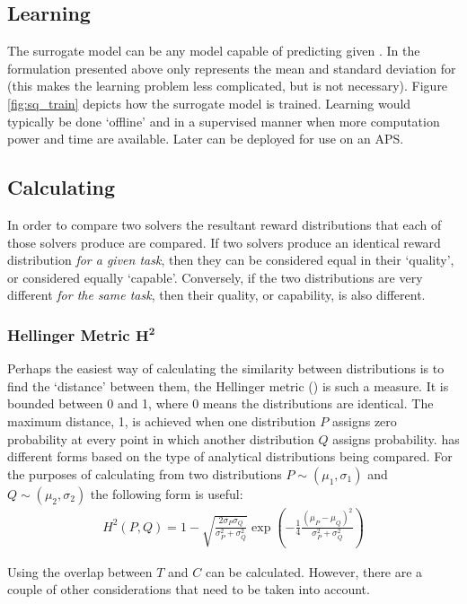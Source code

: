 \subsection{Learning \surrogate}
The surrogate model \surrogate{} can be any model capable of predicting \rwdstarapprox{} given \task. In the formulation presented above \rwdstariapprox{} only represents the mean and standard deviation for \rwdstari{} (this makes the learning problem less complicated, but is not necessary). Figure \ref{fig:sq_train} depicts how the surrogate model is trained. Learning \surrogate{} would typically be done `offline' and in a supervised manner when more computation power and time are available. Later \surrogate{} can be deployed for use on an APS.

\subsection{Calculating \xQ}
In order to compare two solvers the resultant reward distributions that each of those solvers produce are compared. If two solvers produce an identical reward distribution \emph{for a given task}, then they can be considered equal in their `quality', or considered equally `capable'. Conversely, if the two distributions are very different \emph{for the same task}, then their quality, or capability, is also different.

\subsubsection{Hellinger Metric $\bm{H^2}$} \label{sec:hellinger}
Perhaps the easiest way of calculating the similarity between distributions is to find the `distance' between them, the Hellinger metric (\hell) is such a measure. It is bounded between 0 and 1, where 0 means the distributions are identical. The maximum distance, 1, is achieved when one distribution $P$ assigns zero probability at every point in which another distribution $Q$ assigns probability. \hell{} has different forms based on the type of analytical distributions being compared. For the purposes of calculating \xQ{} from two distributions $P \sim (\mu_1,\sigma_1)$ and $Q\sim(\mu_2,\sigma_2)$ the following form is useful:
\begin{align}
    H^{2}(P,Q) = 1-\sqrt{\frac{2\sigma_P\sigma_Q}{\sigma_P^2+\sigma_Q^2}}\exp{\left(-\frac{1}{4}\frac{(\mu_P-\mu_Q)^2}{\sigma_P^2+\sigma_Q^2}\right)}
\end{align}

Using \hell{} the overlap between $T$ and $C$ can be calculated. However, there are a couple of other considerations that need to be taken into account. 

